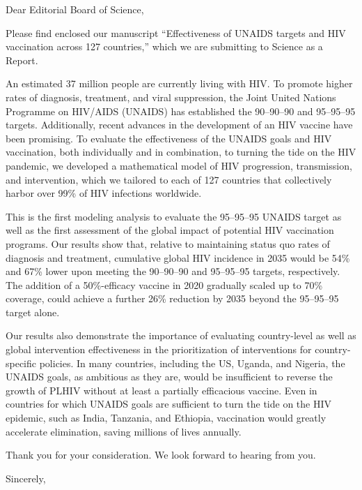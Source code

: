 \documentclass{jpmletter}
\begin{document}
  \begin{letter}{}

    \opening{Dear Editorial Board of Science,}
 
    Please find enclosed our manuscript ``Effectiveness of UNAIDS
    targets and HIV vaccination across 127 countries,'' which we are
    submitting to Science as a Report.
 
    An estimated 37 million people are currently living with HIV. To
    promote higher rates of diagnosis, treatment, and viral
    suppression, the Joint United Nations Programme on HIV/AIDS
    (UNAIDS) has established the 90–90–90 and 95–95–95
    targets. Additionally, recent advances in the development of an
    HIV vaccine have been promising. To evaluate the effectiveness of
    the UNAIDS goals and HIV vaccination, both individually and in
    combination, to turning the tide on the HIV pandemic, we developed
    a mathematical model of HIV progression, transmission, and
    intervention, which we tailored to each of 127 countries that
    collectively harbor over 99\% of HIV infections worldwide.

    This is the first modeling analysis to evaluate the 95–95–95
    UNAIDS target as well as the first assessment of the global impact
    of potential HIV vaccination programs. Our results show that,
    relative to maintaining status quo rates of diagnosis and
    treatment, cumulative global HIV incidence in 2035 would be 54\%
    and 67\% lower upon meeting the 90–90–90 and 95–95–95 targets,
    respectively. The addition of a 50\%-efficacy vaccine in 2020
    gradually scaled up to 70\% coverage, could achieve a further 26\%
    reduction by 2035 beyond the 95–95–95 target alone.

    Our results also demonstrate the importance of evaluating
    country-level as well as global intervention effectiveness in the
    prioritization of interventions for country-specific policies. In
    many countries, including the US, Uganda, and Nigeria, the UNAIDS
    goals, as ambitious as they are, would be insufficient to reverse
    the growth of PLHIV without at least a partially efficacious
    vaccine. Even in countries for which UNAIDS goals are sufficient
    to turn the tide on the HIV epidemic, such as India, Tanzania, and
    Ethiopia, vaccination would greatly accelerate elimination, saving
    millions of lives annually.
 
    Thank you for your consideration. We look forward to hearing from
    you.

    \closing{Sincerely,}

  \end{letter}
\end{document}
